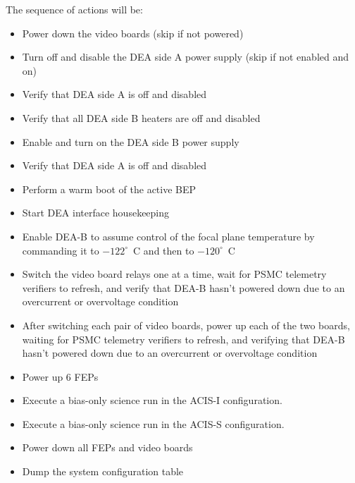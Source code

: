 \documentclass[11pt]{article}
\begin{document}
\noindent The sequence of actions will be:
\begin{itemize}
\item Power down the video boards (skip if not powered)
\vspace{-0.10in}
\item Turn off and disable the DEA side A power supply (skip if not enabled and on)
\vspace{-0.10in}
\item Verify that DEA side A is off and disabled
\vspace{-0.10in}
\item Verify that all DEA side B heaters are off and disabled
\vspace{-0.10in}
\item Enable and turn on the DEA side B power supply
\vspace{-0.10in}
\item Verify that DEA side A is off and disabled
\vspace{-0.10in}
\item Perform a warm boot of the active BEP
\vspace{-0.10in}
\item Start DEA interface housekeeping
\vspace{-0.10in}
\item Enable DEA-B to assume control of the focal plane temperature
by commanding it to $-122^\circ$~C and then to $-120^\circ$~C
\vspace{-0.10in}
\item Switch the video board relays one at a time,
wait for PSMC telemetry verifiers to refresh,
and verify that DEA-B hasn't powered down due to an overcurrent
or overvoltage condition
\vspace{-0.10in}
\item After switching each pair of video boards,
power up each of the two boards, waiting for PSMC telemetry verifiers to 
refresh, and verifying that DEA-B hasn't powered down due to an overcurrent
or overvoltage condition
\vspace{-0.10in}
\item Power up 6 FEPs
\vspace{-0.10in}
\item Execute a bias-only science run in the ACIS-I configuration.
\vspace{-0.10in}
\item Execute a bias-only science run in the ACIS-S configuration.
\vspace{-0.10in}
\item Power down all FEPs and video boards
\vspace{-0.10in}
\item Dump the system configuration table
\end{itemize}
\end{document}
